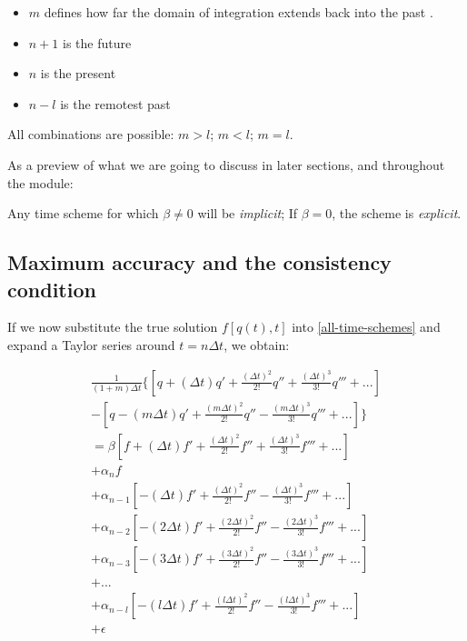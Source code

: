 \begin{itemize}
	\item $m$ defines how far the domain of integration extends back into the past .
	\item $n+1$ is the future
	\item $n$ is the present
	\item $n-l$ is the remotest past
\end{itemize}	

All combinations are possible: $m>l$;  $m<l$; $m=l$.

As a preview of what we are going to discuss in later sections, and throughout the module:

\begin{definition}		
 Any time scheme for which $\beta \ne 0$ will be \emph{implicit}; If $\beta = 0$, the scheme is \emph{explicit}.
 \label{def:implicit}
 \end{definition}

\newpage
\subsection{Maximum accuracy and the consistency condition}

If we now substitute the true solution $f[q(t),t]$ into \ref{all-time-schemes} and expand a Taylor series around $t=n \Delta t$, we obtain:

\begin{multline}
\frac{1}{(1+m) \Delta t}
       \{ \left[ q +     ( \Delta t) q' +  \frac{( \Delta t)^2}    {2!} q'' +  \frac{(    \Delta t)^3}{3!} q''' + ... \right] \\
	- \left[ q - (m \Delta t) q'  + \frac{(m \Delta t)^2}{2!} q'' -    \frac{(m \Delta t)^3}{3!} q'''  + ...  \right] \}
	    \\
	= \beta \left[ f +  (\Delta t) f'   + \frac{(\Delta t)^2}{2!} f'' +  \frac{(\Delta t)^3}{3!} f'''            + ... \right]  \\    
	+ \alpha_n f \\
	+  \alpha_{n-1}  \left[ - (\Delta t) f'      +    \frac{(\Delta t)^2}   {2!} f'' -        \frac{( \Delta t)^3}{3!} f'''    + ... \right]    \\
	+  \alpha_{n-2}  \left[ - (2 \Delta t) f'  +    \frac{(2 \Delta t)^2}{2!} f'' -    \frac{(2 \Delta t)^3}{3!} f'''  + ...   \right]    \\
	+  \alpha_{n-3}  \left[ - (3 \Delta t) f'  +    \frac{(3 \Delta t)^2}{2!} f'' -    \frac{(3 \Delta t)^3}{3!} f'''  + ...  \right]    \\
	+ ... \\
	+  \alpha_{n-l}  \left[ - (l \Delta t) f'  +    \frac{(l \Delta t)^2}{2!} f'' -    \frac{(l \Delta t)^3}{3!} f''' + ...  \right]    \\	
	+  \epsilon \\
\end{multline}

